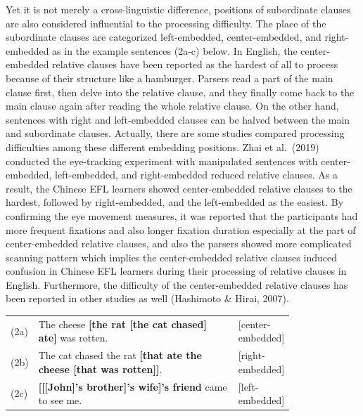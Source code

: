 \documentclass[
]{article}
\begin{document}
Yet it is not merely a cross-linguistic difference, positions of
subordinate clauses are also considered influential to the processing
difficulty. The place of the subordinate clauses are categorized
left-embedded, center-embedded, and right-embedded as in the example
sentences (2a-c) below. In English, the center-embedded relative clauses
have been reported as the hardest of all to process because of their
structure like a hamburger. Parsers read a part of the main clause
first, then delve into the relative clause, and they finally come back
to the main clause again after reading the whole relative clause. On the
other hand, sentences with right and left-embedded clauses can be halved
between the main and subordinate clauses. Actually, there are some
studies compared processing difficulties among these different embedding
positions. Zhai et al.~(2019) conducted the eye-tracking experiment with
manipulated sentences with center-embedded, left-embedded, and
right-embedded reduced relative clauses. As a result, the Chinese EFL
learners showed center-embedded relative clauses to the hardest,
followed by right-embedded, and the left-embedded as the easiest. By
confirming the eye movement measures, it was reported that the
participants had more frequent fixations and also longer fixation
duration especially at the part of center-embedded relative clauses, and
also the parsers showed more complicated scanning pattern which implies
the center-embedded relative clauses induced confusion in Chinese EFL
learners during their processing of relative clauses in English.
Furthermore, the difficulty of the center-embedded relative clauses has
been reported in other studies as well (Hashimoto \& Hirai, 2007).

\vspace{1em}

\setlength{\parindent}{0pt}
\noindent
\begin{tabular}[t]{@{}p{0.05\linewidth} p{0.75\linewidth} >{\raggedleft\arraybackslash}p{2.5cm}@{}}
(2a) & The cheese \textbf{[the rat [the cat chased] ate]} was rotten. & {\small [center-embedded]} \\
(2b) & The cat chased the rat \textbf{[that ate the cheese [that was rotten]]}. & {\small [right-embedded]} \\
(2c) & \textbf{[[[John]'s brother]'s wife]'s friend} came to see me. & {\small [left-embedded]} \\
\end{tabular}

\vspace{0.5em}
\end{document}
